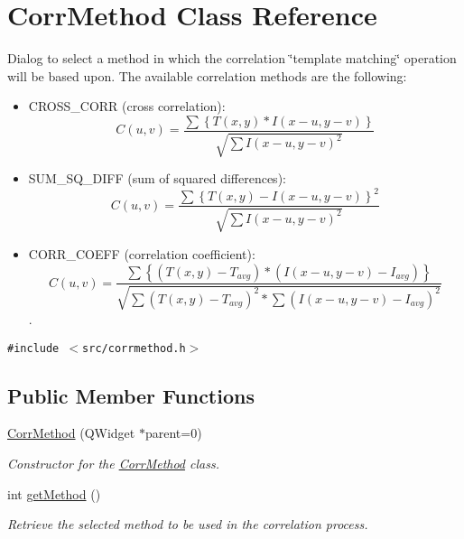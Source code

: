 \hypertarget{classCorrMethod}{
\section{CorrMethod Class Reference}
\label{classCorrMethod}
}
Dialog to select a method in which the correlation \char`\"{}template matching\char`\"{} operation will be based upon. The available correlation methods are the following:\begin{itemize}
\item CROSS\_\-CORR (cross correlation): \[ C(u,v) = \frac {\sum{\left\{T(x,y) * I(x-u,y-v)\right\}}} {\sqrt{ \sum{I(x-u,y-v)^2}}} \]\item SUM\_\-SQ\_\-DIFF (sum of squared differences): \[ C(u,v) = \frac {\sum{\left\{T(x,y)-I(x-u,y-v)\right\}^2}} {\sqrt{\sum{I(x-u,y-v)^2}}} \]\item CORR\_\-COEFF (correlation coefficient): \[ C(u,v) = \frac {\sum{\left\{(T(x,y)-T_{avg}) * (I(x-u,y-v)-I_{avg})\right\}}} {\sqrt{\sum{(T(x,y)-T_{avg})^2} * \sum{(I(x-u,y-v)-I_{avg})^2}}} \]. \end{itemize}
 


{\tt \#include $<$src/corrmethod.h$>$}

\subsection*{Public Member Functions}
\begin{CompactItemize}
\item 
\hypertarget{classCorrMethod_bdc14398267291249d40158e133cf68b}{
\hyperlink{classCorrMethod_bdc14398267291249d40158e133cf68b}{CorrMethod} (QWidget $\ast$parent=0)}
\label{classCorrMethod_bdc14398267291249d40158e133cf68b}

\begin{CompactList}\small\item\em Constructor for the \hyperlink{classCorrMethod}{CorrMethod} class. \item\end{CompactList}\item 
int \hyperlink{classCorrMethod_3eeafdd901560c1fa92be75d4ed58872}{getMethod} ()
\begin{CompactList}\small\item\em Retrieve the selected method to be used in the correlation process. \item\end{CompactList}\end{CompactItemize}

